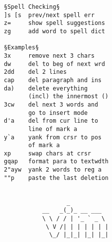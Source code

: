 \documentclass{article}
\begin{document}
\begin{multicols}{4}
\begin{lstlisting}
§Spell Checking§
]s [s  prev/next spell err
z=     show spell suggestions
zg     add word to spell dict

§Examples§
3x     remove next 3 chars
dw     del to beg of next wrd
2dd    del 2 lines
cap    del paragraph and ins
da)    delete everything
       (incl) the innermost ()
3cw    del next 3 words and
       go to insert mode
d'a    del from cur line to
       line of mark a
y`a    yank from crsr to pos
       of mark a
xp     swap chars at crsr
gqap   format para to textwdth
2"ayw  yank 2 words to reg a
""p    paste the last deletion


                  _
           __   _(_)_ __ ___
           \ \ / / | '_ ` _ \
            \ V /| | | | | | |
             \_/ |_|_| |_| |_|
\end{lstlisting}
\end{multicols}
\end{document}
